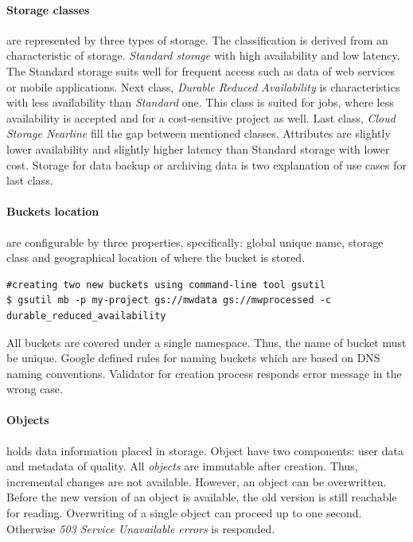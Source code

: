 \documentclass[a4paper,12pt,oneside]{report}
\begin{document}
	
	\paragraph{Storage classes} are represented by three types of storage. The
	classification is derived from an characteristic of storage. \textit{Standard
		storage} with high availability and low 
	latency. The Standard storage suits well for frequent access such 
	as data of web services or mobile applications.
	Next class, \textit{Durable Reduced Availability} is characteristics with less
	availability than  \textit{Standard} one. 
	This class is suited for jobs, where less availability is accepted and for a
	cost-sensitive project as well. 
	Last class, \textit{Cloud Storage Nearline} fill the gap between mentioned
	classes. Attributes are slightly lower availability and slightly higher 
	latency than Standard storage with lower cost. 
	Storage for data backup or archiving data is two explanation of use cases for
	last class.
	
	\paragraph{Buckets location} are configurable by three properties, specifically:
	global unique 
	name, storage class and geographical location of where the bucket is stored.
	\begin{footnotesize}
		\begin{lstlisting}[style=mybash]
#creating two new buckets using command-line tool gsutil
$ gsutil mb -p my-project gs://mwdata gs://mwprocessed -c
durable_reduced_availability
		\end{lstlisting}
	\end{footnotesize}
	All buckets are covered under a single namespace. Thus, the name of bucket must
	be unique. 
	Google defined rules for naming buckets which are based on DNS naming
	conventions. Validator for creation process responds error message in the wrong
	case. 
	
	\paragraph{Objects} holds data information placed in storage. Object have two
	components: 
	user data and metadata of quality. All \textit{objects} are immutable after
	creation. Thus, incremental changes are not available. However, an object 
	can be overwritten. Before the new version of an object is available, the old
	version is still 
	reachable for reading. Overwriting of a single object 
	can proceed up to one second. Otherwise \textit{503 Service Unavailable errors}
	is responded.
	
\end{document}
